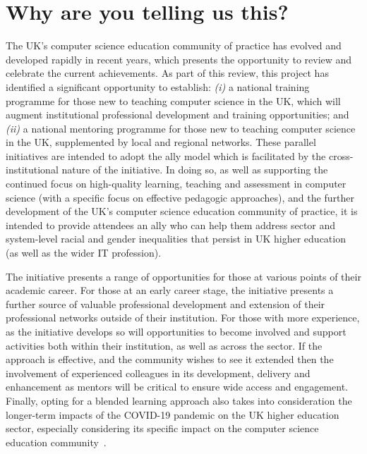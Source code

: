 \documentclass[sigconf]{acmart}
\begin{document}
\section{Why are you telling us this?}	
The UK's computer science education community of practice has evolved
and developed rapidly in recent years, which presents the opportunity
to review and celebrate the current achievements. As part of this
review, this project has identified a significant opportunity to
establish: {\emph{(i)}} a national training programme for those new to
teaching computer science in the UK, which will augment institutional
professional development and training opportunities; and {\emph{(ii)}}
a national mentoring programme for those new to teaching computer
science in the UK, supplemented by local and regional networks. These
parallel initiatives are intended to adopt the ally model which is
facilitated by the cross-institutional nature of the initiative. In
doing so, as well as supporting the continued focus on high-quality
learning, teaching and assessment in computer science (with a specific
focus on effective pedagogic approaches), and the further development
of the UK's computer science education community of practice, it is
intended to provide attendees an ally who can help them address sector
and system-level racial and gender inequalities that persist in UK
higher education (as well as the wider IT
profession).


The initiative presents a range of opportunities for those at various
points of their academic career. For those at an early career stage,
the initiative presents a further source of valuable professional
development and extension of their professional networks outside of
their institution. For those with more experience, as the initiative
develops so will opportunities to become involved and support
activities both within their institution, as well as across the
sector. If the approach is effective, and the community wishes to see
it extended then the involvement of experienced colleagues in its
development, delivery and enhancement as mentors will be critical to
ensure wide access and engagement. Finally, opting for a blended
learning approach also takes into consideration the longer-term impacts of
the COVID-19 pandemic on the UK higher education sector, especially
considering its specific impact on the computer science education
community~\cite{crick-et-al:ukicer2020}.
\end{document}

